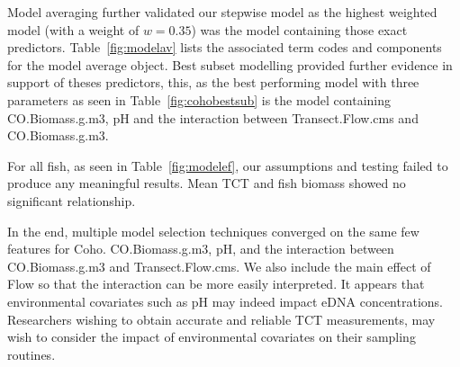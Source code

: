 \vspace{5mm}


Model averaging further validated our stepwise model as the highest weighted model (with a weight of $w=0.35$) was the model containing those exact predictors. Table~\ref{fig:modelav} lists the associated term codes and components for the model average object. Best subset modelling provided further evidence in support of theses predictors, this, as the best performing model with three parameters as seen in Table~\ref{fig:cohobestsub} is the model containing CO.Biomass.g.m3, pH and the interaction between Transect.Flow.cms and CO.Biomass.g.m3.
 

\vspace{5mm}


For all fish, as seen in Table~\ref{fig:modelef}, our assumptions and testing failed to produce any meaningful results. Mean TCT and fish biomass showed no significant relationship.

\vspace{5mm}

In the end, multiple model selection techniques converged on the same few features for Coho. CO.Biomass.g.m3, pH, and the interaction between CO.Biomass.g.m3 and Transect.Flow.cms. We also include the main effect of Flow so that the interaction can be more easily interpreted. It appears that environmental covariates such as pH may indeed impact eDNA concentrations. Researchers wishing to obtain accurate and reliable TCT measurements, may wish to consider the impact of environmental covariates on their sampling routines.

